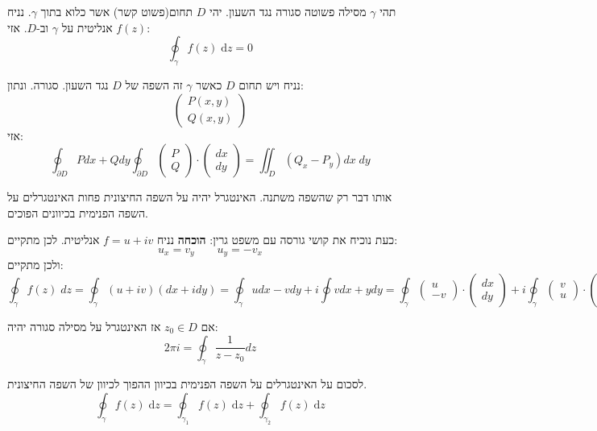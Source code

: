 \documentclass{tstextbook}
\begin{document}
\begin{theorem}
תהי \(\gamma\) מסילה פשוטה סגורה נגד השעון. יהי \(D\) תחום(פשוט קשר) אשר כלוא בתוך \(\gamma\). נניח \(f(z)\) אנליטית על \(\gamma\) וב-\(D\). אזי:
$$\oint_{\gamma}f(z)\;\mathrm{d}z=0$$

\end{theorem}
\begin{theorem}[גרין]
נניח ויש תחום \(D\) כאשר \(\gamma\) זה השפה של \(D\) נגד השעון. סגורה. ונתון:
$$\begin{pmatrix}P(x,y) \\Q(x,y) 
\end{pmatrix}$$
אזי:
$$\oint_{\partial D} Pdx+Qdy\oint_{\partial D}\begin{pmatrix}P\\Q\end{pmatrix} \cdot \begin{pmatrix}dx\\ dy
\end{pmatrix} = \iint_{D} (Q_{x}-P_{y})dx\;dy$$

\end{theorem}
\begin{theorem}
אותו דבר רק שהשפה משתנה. האינטגרל יהיה על השפה החיצונית פחות האינטגרלים על השפה הפנימית בכיוונים הפוכים.

\end{theorem}
כעת נוכיח את קושי גורסה עם משפט גרין:
\textbf{הוכחה}
נניח \(f=u+iv\) אנליטית. לכן מתקיים:
$$u_{x}=v_{y}\qquad u_{y}=-v_{x}$$
ולכן מתקיים:
$$\oint_{\gamma} f(z)\;dz=\oint_{\gamma }(u+iv)(dx+idy)=\oint_{\gamma}udx-vdy+i\oint vdx+ydy = \oint_{\gamma} \begin{pmatrix}u\\ -v \end{pmatrix}\cdot \begin{pmatrix}dx \\ dy\end{pmatrix}+i\oint_{\gamma}\begin{pmatrix}v \\ u\end{pmatrix}\cdot \begin{pmatrix}dx \\ dy
\end{pmatrix}$$

\begin{proposition}
אם \(z_{0} \in D\) אז האינטגרל על מסילה סגורה יהיה:
$$2\pi i = \oint_{\gamma} \frac{1}{z-z_{0}}dz$$

\end{proposition}
\begin{theorem}
לסכום על האינטגרלים על השפה הפנימית בכיוון ההפוך לכיוון של השפה החיצונית.
$$\oint_{\gamma} f(z) \;\mathrm{d}z = \oint_{\gamma_{1}} f(z)\;\mathrm{d}z+\oint_{\gamma_{2}} f(z)\;\mathrm{d}z$$

\end{theorem}
\end{document}
